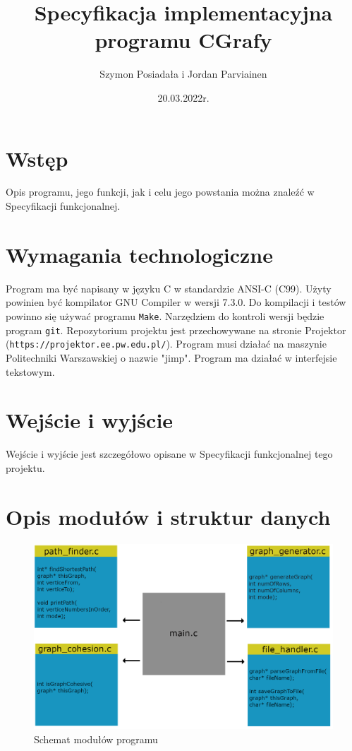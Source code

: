 \documentclass{article}
\title{Specyfikacja implementacyjna programu CGrafy}
\author{Szymon Posiadała i Jordan Parviainen}
\date{20.03.2022r.}
\begin{document}
\maketitle

\thispagestyle{firststyle}

\section{Wstęp}
Opis programu, jego funkcji, jak i celu jego powstania można znaleźć w Specyfikacji funkcjonalnej.

\section{Wymagania technologiczne}
Program ma być napisany w języku C w standardzie ANSI-C (C99). Użyty powinien być kompilator GNU Compiler w wersji 7.3.0. Do kompilacji i testów powinno się używać programu \texttt{Make}. Narzędziem do kontroli wersji będzie program \texttt{git}. Repozytorium projektu jest przechowywane na stronie Projektor (\texttt{https://projektor.ee.pw.edu.pl/}). Program musi działać na maszynie Politechniki Warszawskiej o nazwie "jimp". Program ma działać w interfejsie tekstowym.

\section{Wejście i wyjście}
Wejście i wyjście jest szczegółowo opisane w Specyfikacji funkcjonalnej tego projektu.

\section{Opis modułów i struktur danych}
\begin{figure}[h]
    \centering
    \includegraphics[scale=0.4]{si}
    \caption{Schemat modułów programu}
    \label{fig:schemat}
\end{figure}
\end{document}
